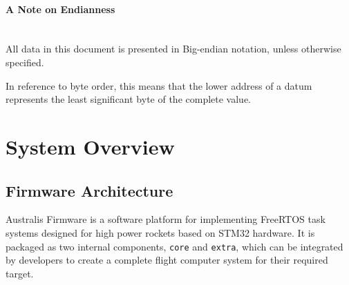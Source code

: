 \clearpage

\paragraph{A Note on Endianness}\mbox{} \\
All data in this document is presented in Big-endian notation, unless otherwise specified. 

In reference to byte order, this means that the lower address of a datum represents the least significant byte of the complete value.


\section{System Overview}

\subsection{Firmware Architecture}
Australis Firmware is a software platform for implementing FreeRTOS task systems designed for high power rockets based on STM32 hardware. It is packaged as two internal components, \verb|core| and \verb|extra|, which can be integrated by developers to create a complete flight computer system for their required target.

